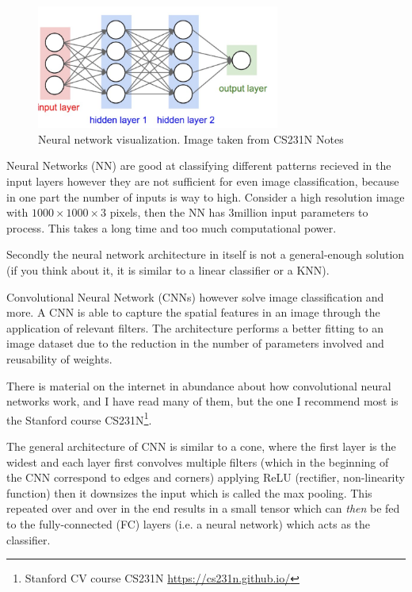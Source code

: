 \begin{figure}[!ht]
    \centering
    \includegraphics[width=80mm, keepaspectratio]{figures/nn.png}
    \caption{Neural network visualization. Image taken from CS231N Notes}
    \label{fig:convnet}
\end{figure}

Neural Networks (NN) are good at classifying different patterns recieved in the
input layers however they are not sufficient for even image classification,
because in one part the number of inputs is way to high. Consider a high
resolution image with $1000\times 1000\times 3$ pixels, then the NN has 3million input
parameters to process. This takes a long time and too much computational power.

Secondly the neural network architecture in itself is not a
general-enough solution (if you think about it, it is similar to a linear
classifier or a KNN).

Convolutional Neural Network (CNNs) however solve image classification and more.
A CNN is able to capture the spatial features in an image through the
application of relevant filters. The architecture performs a better fitting to
an image dataset due to the reduction in the number of parameters involved and
reusability of weights.


There is material on the internet in abundance about how convolutional neural
networks work, and I have read many of them, but the one I recommend most is the
Stanford course CS231N\footnote{ Stanford CV course CS231N
\url{https://cs231n.github.io/}}. 

The general architecture of CNN is similar to a cone, where the first layer is
the widest and each layer first convolves multiple filters (which in the
beginning of the CNN correspond to edges and corners) applying ReLU (rectifier,
non-linearity function) then it downsizes the input which is called the max
pooling. This repeated over and over in the end results in a small tensor
which can \emph{then} be fed to the fully-connected (FC) layers (i.e. a neural network)
which acts as the classifier.

